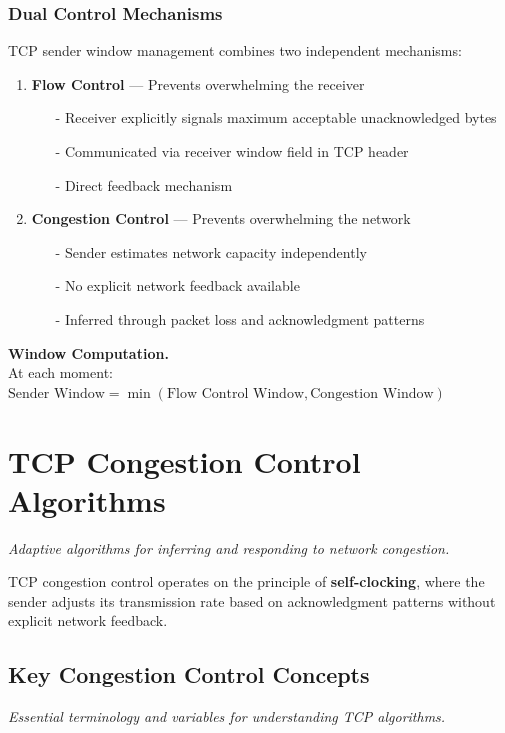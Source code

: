 \documentclass[../../compsys.tex]{subfiles}
\begin{document}
\subsubsection{Dual Control Mechanisms}
TCP sender window management combines two independent mechanisms:

\begin{enumerate}
  \item \textbf{Flow Control} — Prevents overwhelming the receiver
  \begin{itemize}
    \item[-] Receiver explicitly signals maximum acceptable unacknowledged bytes
    \item[-] Communicated via receiver window field in TCP header
    \item[-] Direct feedback mechanism
  \end{itemize}

  \item \textbf{Congestion Control} — Prevents overwhelming the network
  \begin{itemize}
    \item[-] Sender estimates network capacity independently
    \item[-] No explicit network feedback available
    \item[-] Inferred through packet loss and acknowledgment patterns
  \end{itemize}
\end{enumerate}

\textbf{Window Computation.} \\
At each moment: $\text{Sender Window} = \min(\text{Flow Control Window}, \text{Congestion Window})$
\newpage
\section{TCP Congestion Control Algorithms}
\textit{Adaptive algorithms for inferring and responding to network congestion.}

TCP congestion control operates on the principle of \textbf{self-clocking}, where the sender adjusts its transmission rate based on acknowledgment patterns without explicit network feedback.

\subsection{Key Congestion Control Concepts}
\textit{Essential terminology and variables for understanding TCP algorithms.}
\end{document}
